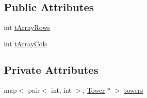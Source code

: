 \subsection*{Public Attributes}
\begin{DoxyCompactItemize}
\item 
int \hyperlink{class_tower_manager_a11ff48fe3d8fbaaeb2b0380893c35990}{t\+Array\+Rows}
\item 
int \hyperlink{class_tower_manager_a5c5df568b2ea8dd7220fed1d850c4050}{t\+Array\+Cols}
\end{DoxyCompactItemize}
\subsection*{Private Attributes}
\begin{DoxyCompactItemize}
\item 
map$<$ pair$<$ int, int $>$, \hyperlink{class_tower}{Tower} $\ast$ $>$ \hyperlink{class_tower_manager_aff1fd2b7123af1d48255ee4dfe19c637}{towers}
\end{DoxyCompactItemize}


